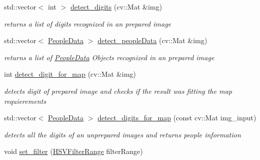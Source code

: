 \begin{DoxyCompactItemize}
std\+::vector$<$ int $>$ \mbox{\hyperlink{class_digit___recognition_ac86fd9273fe2bf09efc1b804d49e370f}{detect\+\_\+digits}} (cv\+::\+Mat \&img)
\begin{DoxyCompactList}\small\item\em returns a list of digits recognized in an prepared image \end{DoxyCompactList}\item 
\mbox{\label{class_digit___recognition_af8244a36e7b044ef37c768de30ffed4b}} 
std\+::vector$<$ \mbox{\hyperlink{struct_people_data}{People\+Data}} $>$ \mbox{\hyperlink{class_digit___recognition_af8244a36e7b044ef37c768de30ffed4b}{detect\+\_\+people\+Data}} (cv\+::\+Mat \&img)
\begin{DoxyCompactList}\small\item\em returns a list of \mbox{\hyperlink{struct_people_data}{People\+Data}} Objects recognized in an prepared image \end{DoxyCompactList}\item 
\mbox{\label{class_digit___recognition_a479e6126291463d9117abc6553c555df}} 
int \mbox{\hyperlink{class_digit___recognition_a479e6126291463d9117abc6553c555df}{detect\+\_\+digit\+\_\+for\+\_\+map}} (cv\+::\+Mat \&img)
\begin{DoxyCompactList}\small\item\em detects digit of prepared image and checks if the result was fitting the map requierements \end{DoxyCompactList}\item 
\mbox{\label{class_digit___recognition_aad1207aa02e043af5505c217ef1996b9}} 
std\+::vector$<$ \mbox{\hyperlink{struct_people_data}{People\+Data}} $>$ \mbox{\hyperlink{class_digit___recognition_aad1207aa02e043af5505c217ef1996b9}{detect\+\_\+digits\+\_\+for\+\_\+map}} (const cv\+::\+Mat img\+\_\+input)
\begin{DoxyCompactList}\small\item\em detects all the digits of an unprepared images and returns people information \end{DoxyCompactList}\item 
\mbox{\label{class_digit___recognition_a68484f6730ee2f0fc2050726c3ff2252}} 
void \mbox{\hyperlink{class_digit___recognition_a68484f6730ee2f0fc2050726c3ff2252}{set\+\_\+filter}} (\mbox{\hyperlink{struct_h_s_v_filter_range}{H\+S\+V\+Filter\+Range}} filter\+Range)

\end{DoxyCompactItemize}
